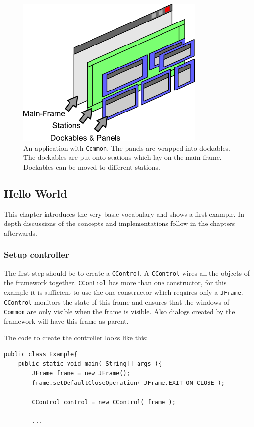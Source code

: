 \documentclass[a4paper,10pt]{article}
\newcommand{\src}[1]{\texttt{#1}}
\begin{document}
\begin{figure}[ht]
\centering
\includegraphics[scale=1]{app_with}
\caption{An application with \src{Common}. The panels are wrapped into dockables. The dockables are put onto stations which lay on the main-frame. Dockables can be moved to different stations.}
\label{fig:app_with}
\end{figure}

\subsection{Hello World}
This chapter introduces the very basic vocabulary and shows a first example. In depth discussions of the concepts and implementations follow in the chapters afterwards.

\subsubsection{Setup controller}
The first step should be to create a \src{CControl}. A \src{CControl} wires all the objects of the framework together. \src{CControl} has more than one constructor, for this example it is sufficient to use the one constructor which requires only a \src{JFrame}. \src{CControl} monitors the state of this frame and ensures that the windows of \src{Common} are only visible when the frame is visible. Also dialogs created by the framework will have this frame as parent.

The code to create the controller looks like this:
\begin{lstlisting}
public class Example{
	public static void main( String[] args ){
		JFrame frame = new JFrame();
		frame.setDefaultCloseOperation( JFrame.EXIT_ON_CLOSE );
		
		CControl control = new CControl( frame );
		
		...
\end{lstlisting}
\end{document}
